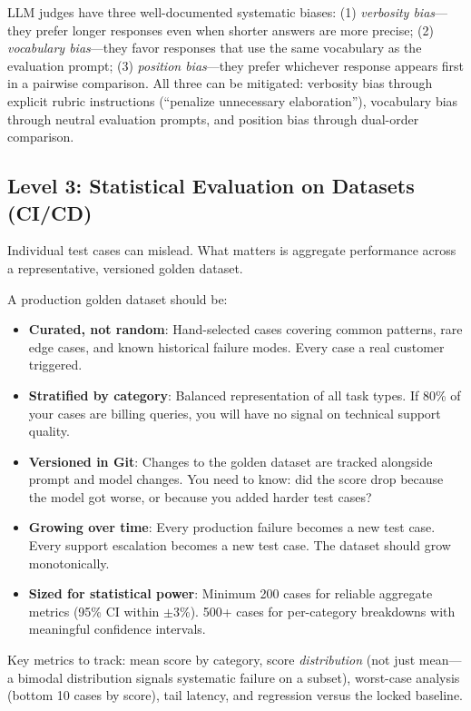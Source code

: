 \begin{cautionbox}
LLM judges have three well-documented systematic biases: (1) \emph{verbosity bias}---they prefer longer responses even when shorter answers are more precise; (2) \emph{vocabulary bias}---they favor responses that use the same vocabulary as the evaluation prompt; (3) \emph{position bias}---they prefer whichever response appears first in a pairwise comparison. All three can be mitigated: verbosity bias through explicit rubric instructions (``penalize unnecessary elaboration''), vocabulary bias through neutral evaluation prompts, and position bias through dual-order comparison.
\end{cautionbox}


\subsection{Level 3: Statistical Evaluation on Datasets (CI/CD)}

Individual test cases can mislead. What matters is aggregate performance across a representative, versioned golden dataset.

A production golden dataset should be:

\begin{itemize}[leftmargin=*]
    \item \textbf{Curated, not random}: Hand-selected cases covering common patterns, rare edge cases, and known historical failure modes. Every case a real customer triggered.
    \item \textbf{Stratified by category}: Balanced representation of all task types. If 80\% of your cases are billing queries, you will have no signal on technical support quality.
    \item \textbf{Versioned in Git}: Changes to the golden dataset are tracked alongside prompt and model changes. You need to know: did the score drop because the model got worse, or because you added harder test cases?
    \item \textbf{Growing over time}: Every production failure becomes a new test case. Every support escalation becomes a new test case. The dataset should grow monotonically.
    \item \textbf{Sized for statistical power}: Minimum 200 cases for reliable aggregate metrics (95\% CI within $\pm$3\%). 500+ cases for per-category breakdowns with meaningful confidence intervals.
\end{itemize}

Key metrics to track: mean score by category, score \emph{distribution} (not just mean---a bimodal distribution signals systematic failure on a subset), worst-case analysis (bottom 10 cases by score), tail latency, and regression versus the locked baseline.



